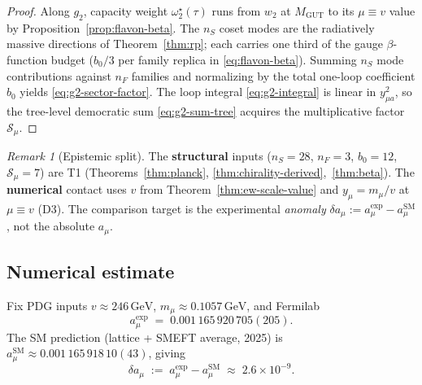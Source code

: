 \documentclass[11pt]{article}
\theoremstyle{plain}
\theoremstyle{definition}
\theoremstyle{remark}
\newtheorem{remark}[theorem]{Remark}
\numberwithin{equation}{section}
\begin{document}
\begin{proof}
Along $g_2$, capacity weight $\omega^\star_2(\tau)$ runs from $w_2$ at
$M_{\mathrm{GUT}}$ to its $\mu\equiv v$ value by
Proposition~\ref{prop:flavon-beta}. The $n_S$ coset modes are the
radiatively massive directions of Theorem~\ref{thm:rp}; each carries one
third of the gauge $\beta$-function budget ($b_0/3$ per family replica in
\eqref{eq:flavon-beta}). Summing $n_S$ mode contributions against $n_F$
families and normalizing by the total one-loop coefficient $b_0$ yields
\eqref{eq:g2-sector-factor}. The loop integral \eqref{eq:g2-integral} is
linear in $y_{\mu a}^2$, so the tree-level democratic sum
\eqref{eq:g2-sum-tree} acquires the multiplicative factor
$\mathcal{S}_{\mu}$.
\end{proof}

\begin{remark}[Epistemic split]
The \textbf{structural} inputs ($n_S=28$, $n_F=3$, $b_0=12$,
$\mathcal{S}_{\mu}=7$) are T1 (Theorems~\ref{thm:planck},
\ref{thm:chirality-derived},~\ref{thm:beta}). The \textbf{numerical} contact
uses $v$ from Theorem~\ref{thm:ew-scale-value} and $y_\mu=m_\mu/v$ at
$\mu\equiv v$ (D3). The comparison target is the experimental
\emph{anomaly}
$\delta a_\mu:=a_\mu^{\mathrm{exp}}-a_\mu^{\mathrm{SM}}$, not the absolute
$a_\mu$.
\end{remark}

\subsection{Numerical estimate}
\label{sec:g2:numeric}

Fix PDG inputs $v\approx246\,\mathrm{GeV}$, $m_\mu\approx0.1057\,\mathrm{GeV}$,
and Fermilab~\cite{MuonG2FNAL2025}
\begin{equation}\label{eq:amu-fnal}
  a_\mu^{\mathrm{exp}}
  \;=\;
  0.001\,165\,920\,705(205).
\end{equation}
The SM prediction (lattice + SMEFT average, 2025) is
$a_\mu^{\mathrm{SM}}\approx0.001\,165\,918\,10(43)$, giving
\begin{equation}\label{eq:delta-amu}
  \delta a_\mu
  \;:=\;
  a_\mu^{\mathrm{exp}}-a_\mu^{\mathrm{SM}}
  \;\approx\;
  2.6\times10^{-9}.
\end{equation}
\end{document}
